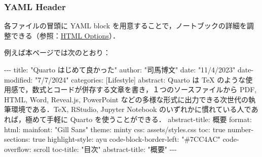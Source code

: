 \documentclass[
]{ltjsarticle}
\newenvironment{Shaded}{\begin{snugshade}}{\end{snugshade}}
\newcommand{\AttributeTok}[1]{\textcolor[rgb]{0.40,0.45,0.13}{#1}}
\newcommand{\CharTok}[1]{\textcolor[rgb]{0.13,0.47,0.30}{#1}}
\newcommand{\FunctionTok}[1]{\textcolor[rgb]{0.28,0.35,0.67}{#1}}
\newcommand{\KeywordTok}[1]{\textcolor[rgb]{0.00,0.23,0.31}{#1}}
\newcommand{\PreprocessorTok}[1]{\textcolor[rgb]{0.68,0.00,0.00}{#1}}
\newcommand{\StringTok}[1]{\textcolor[rgb]{0.13,0.47,0.30}{#1}}
\begin{document}
\subsubsection{YAML Header}\label{yaml-header}

各ファイルの冒頭に YAML block
を用意することで，ノートブックの詳細を調整できる（参照：\href{https://quarto.org/docs/reference/formats/html.html}{HTML
Options}）．

例えば本ページでは次のとおり：

\begin{Shaded}
\begin{Highlighting}[]
\PreprocessorTok{{-}{-}{-}}
\FunctionTok{title}\KeywordTok{:}\AttributeTok{ }\StringTok{"Quarto はじめて良かった"}
\FunctionTok{author}\KeywordTok{:}\AttributeTok{ }\StringTok{"司馬博文"}
\FunctionTok{date}\KeywordTok{:}\AttributeTok{ }\StringTok{"11/4/2023"}
\FunctionTok{date{-}modified}\KeywordTok{:}\AttributeTok{ }\StringTok{"7/7/2024"}
\FunctionTok{categories}\KeywordTok{:}\AttributeTok{ }\KeywordTok{[}\AttributeTok{Lifestyle}\KeywordTok{]}
\FunctionTok{abstract}\KeywordTok{:}\AttributeTok{ Quarto は TeX のような使用感で，数式とコードが併存する文章を書き，１つのソースファイルから PDF, HTML, Word, Reveal.js, PowerPoint などの多様な形式に出力できる次世代の執筆環境である．TeX, RStudio, Jupyter Notebook のいずれかに慣れている人であれば，極めて手軽に Quarto を使うことができる．}
\FunctionTok{abstract{-}title}\KeywordTok{:}\AttributeTok{ 概要}
\FunctionTok{format}\KeywordTok{:}
\AttributeTok{  }\FunctionTok{html}\KeywordTok{:}
\AttributeTok{    }\FunctionTok{mainfont}\KeywordTok{:}\AttributeTok{ }\StringTok{"Gill Sans"}
\AttributeTok{    }\FunctionTok{theme}\KeywordTok{:}\AttributeTok{ minty}
\AttributeTok{    }\FunctionTok{css}\KeywordTok{:}\AttributeTok{ assets/styles.css}
\AttributeTok{    }\FunctionTok{toc}\KeywordTok{:}\AttributeTok{ }\CharTok{true}
\AttributeTok{    }\FunctionTok{number{-}sections}\KeywordTok{:}\AttributeTok{ }\CharTok{true}
\AttributeTok{    }\FunctionTok{highlight{-}style}\KeywordTok{:}\AttributeTok{ ayu}
\AttributeTok{    }\FunctionTok{code{-}block{-}border{-}left}\KeywordTok{:}\AttributeTok{ }\StringTok{"\#7CC4AC"}
\AttributeTok{    }\FunctionTok{code{-}overflow}\KeywordTok{:}\AttributeTok{ scroll}
\AttributeTok{    }\FunctionTok{toc{-}title}\KeywordTok{:}\AttributeTok{ }\StringTok{"目次"}
\AttributeTok{    }\FunctionTok{abstract{-}title}\KeywordTok{:}\AttributeTok{ }\StringTok{"概要"}
\PreprocessorTok{{-}{-}{-}}
\end{Highlighting}
\end{Shaded}
\end{document}
